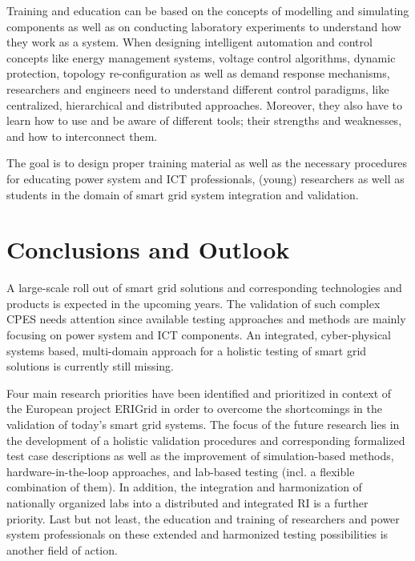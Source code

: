 \documentclass[runningheads,a4paper]{llncs}
\begin{document}
Training and education can be based on the concepts of modelling and simulating components as well as on conducting laboratory experiments to understand how they work as a system. When designing intelligent automation and control concepts like energy management systems, voltage control algorithms, dynamic protection, topology re-configuration as well as demand response mechanisms, researchers and engineers need to understand different control paradigms, like centralized, hierarchical and distributed approaches. Moreover, they also have to learn  how to use and be aware of different tools; their strengths and weaknesses, and how to interconnect them. 

The goal is to design proper training material as well as the necessary procedures for educating power system and ICT professionals, (young) researchers as well as students in the domain of smart grid system integration and validation.
%
%
\section{Conclusions and Outlook}
\label{sec:conclusions}

A large-scale roll out of smart grid solutions and corresponding technologies and products is expected in the upcoming years. The validation of such complex CPES needs attention since available testing approaches and methods are mainly focusing on power system and ICT components. An integrated, cyber-physical systems based, multi-domain approach for a holistic testing of smart grid solutions is currently still missing.

Four main research priorities have been identified and prioritized in context of the European project ERIGrid in order to overcome the shortcomings in the validation of today's smart grid systems. The focus of the future research lies in the development of a holistic validation procedures and corresponding formalized test case descriptions as well as the improvement of simulation-based methods, hardware-in-the-loop approaches, and lab-based testing (incl. a flexible combination of them). In addition, the integration and harmonization of nationally organized labs into a distributed and integrated RI is a further priority. Last but not least, the education and training of researchers and power system professionals on these extended and harmonized testing possibilities is another field of action. 
%
%
\end{document}
